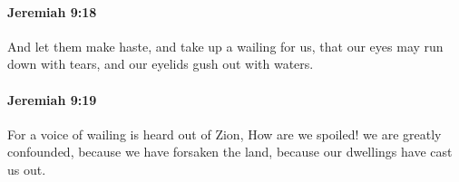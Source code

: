 		\paragraph{Jeremiah 9:18} %
			\label{JEREMIAH-9-18}

			And let them make haste, and take up a wailing for us, that our eyes may run down with tears, and our eyelids gush out with waters.


		\paragraph{Jeremiah 9:19} %
			\label{JEREMIAH-9-19}

			For a voice of wailing is heard out of Zion, How are we spoiled! we are greatly confounded, because we have forsaken the land, because our dwellings have cast us out.


